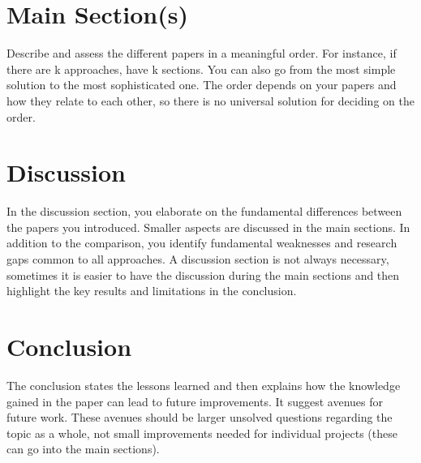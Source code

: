 \documentclass[twocolumn]{article}
\begin{document}
\section{Main Section(s)}

Describe and assess the different papers in a meaningful order. For instance,  if there are k approaches,  have k sections.  You can also go from the most simple solution to the most sophisticated one.   The order depends on your papers and how they relate to each other, so there is no universal solution for deciding on the order. 

\section{Discussion}
In the discussion section,  you elaborate on the fundamental differences between the papers you introduced. 
Smaller aspects are discussed in the main sections.  In addition to the comparison,  you identify fundamental weaknesses and research gaps common to all approaches. 
A discussion section is not always necessary, sometimes it is easier to have the discussion during the main sections and then highlight the key results and limitations in the conclusion. 

\section{Conclusion}
The conclusion states the lessons learned and then explains how the knowledge gained in the paper can lead to future improvements. It suggest avenues for future work. These avenues should be larger unsolved questions regarding the topic as a whole,  not small improvements needed for  individual projects (these can go into the main sections). 




\end{document}
